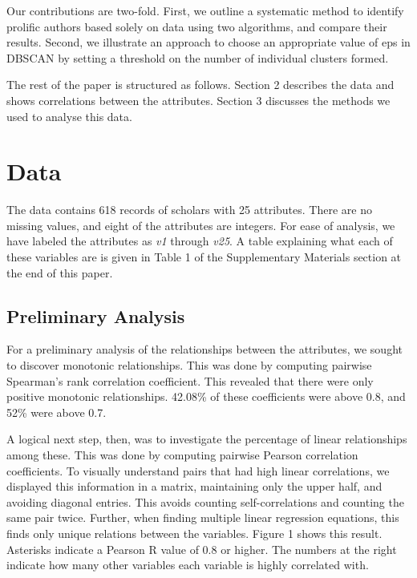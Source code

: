 \documentclass[smallextended]{svjour3}
\begin{document}
	Our contributions are two-fold. First, we outline a systematic method to identify prolific authors based solely on data using two algorithms, and compare their results. Second, we illustrate an approach to choose an appropriate value of eps in DBSCAN by setting a threshold on the number of individual clusters formed.
	
	The rest of the paper is structured as follows. Section 2 describes the data and shows correlations between the attributes. Section 3 discusses the methods we used to analyse this data.

	\section{Data}
	The data contains 618 records of scholars with 25 attributes. There are no missing values, and eight of the attributes are integers. For ease of analysis, we have labeled the attributes as \textit{v1} through \textit{v25}. A table explaining what each of these variables are is given in Table 1 of the Supplementary Materials section at the end of this paper.
	
	\subsection{Preliminary Analysis}
	For a preliminary analysis of the relationships between the attributes, we sought to discover monotonic relationships. This was done by computing pairwise Spearman's rank correlation coefficient. This revealed that there were only positive monotonic relationships. 42.08\% of these coefficients were above 0.8, and 52\% were above 0.7.
	
	A logical next step, then, was to investigate the percentage of linear relationships among these. This was done by computing pairwise Pearson correlation coefficients. To visually understand pairs that had high linear correlations, we displayed this information in a matrix, maintaining only the upper half, and avoiding diagonal entries. This avoids counting self-correlations and counting the same pair twice. Further, when finding multiple linear regression equations, this finds only unique relations between the variables. Figure 1 shows this result. Asterisks indicate a Pearson R value of 0.8 or higher. The numbers at the right indicate how many other variables each variable is highly correlated with. \\
	
\end{document}
